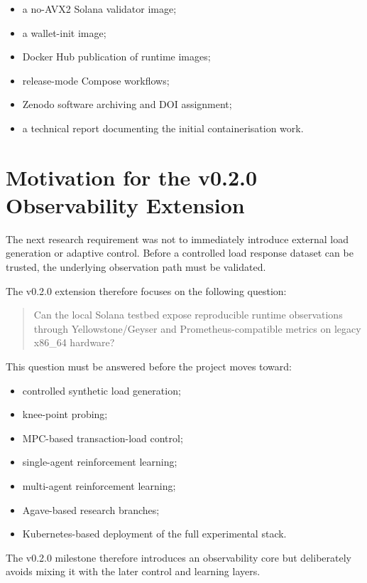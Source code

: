 \documentclass[11pt,a4paper]{article}
\begin{document}
\begin{itemize}[leftmargin=2em]
  \item a no-AVX2 Solana validator image;
  \item a wallet-init image;
  \item Docker Hub publication of runtime images;
  \item release-mode Compose workflows;
  \item Zenodo software archiving and DOI assignment;
  \item a technical report documenting the initial containerisation work.
\end{itemize}

\section{Motivation for the v0.2.0 Observability Extension}

The next research requirement was not to immediately introduce external load generation or adaptive control. Before a controlled load response dataset can be trusted, the underlying observation path must be validated.

The v0.2.0 extension therefore focuses on the following question:

\begin{quote}
Can the local Solana testbed expose reproducible runtime observations through Yellowstone/Geyser and Prometheus-compatible metrics on legacy x86\_64 hardware?
\end{quote}

This question must be answered before the project moves toward:

\begin{itemize}[leftmargin=2em]
  \item controlled synthetic load generation;
  \item knee-point probing;
  \item MPC-based transaction-load control;
  \item single-agent reinforcement learning;
  \item multi-agent reinforcement learning;
  \item Agave-based research branches;
  \item Kubernetes-based deployment of the full experimental stack.
\end{itemize}

The v0.2.0 milestone therefore introduces an observability core but deliberately avoids mixing it with the later control and learning layers.
\end{document}
